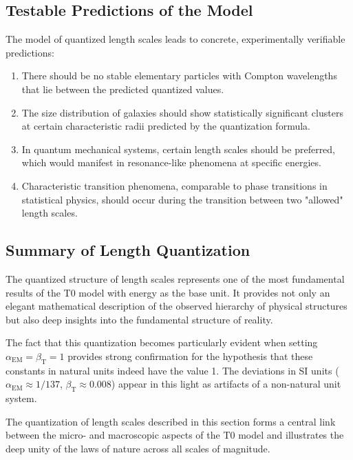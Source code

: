 \documentclass[12pt,a4paper]{article}
\newcommand{\alphaEM}{\alpha_{\text{EM}}}
\newcommand{\betaT}{\beta_{\text{T}}}
\begin{document}
\subsection{Testable Predictions of the Model}

The model of quantized length scales leads to concrete, experimentally verifiable predictions:

\begin{enumerate}
	\item There should be no stable elementary particles with Compton wavelengths that lie between the predicted quantized values.
	
	\item The size distribution of galaxies should show statistically significant clusters at certain characteristic radii predicted by the quantization formula.
	
	\item In quantum mechanical systems, certain length scales should be preferred, which would manifest in resonance-like phenomena at specific energies.
	
	\item Characteristic transition phenomena, comparable to phase transitions in statistical physics, should occur during the transition between two "allowed" length scales.
\end{enumerate}

\subsection{Summary of Length Quantization}

The quantized structure of length scales represents one of the most fundamental results of the T0 model with energy as the base unit. It provides not only an elegant mathematical description of the observed hierarchy of physical structures but also deep insights into the fundamental structure of reality.

The fact that this quantization becomes particularly evident when setting $\alphaEM = \betaT = 1$ provides strong confirmation for the hypothesis that these constants in natural units indeed have the value 1. The deviations in SI units ($\alphaEM \approx 1/137$, $\betaT \approx 0.008$) appear in this light as artifacts of a non-natural unit system.

The quantization of length scales described in this section forms a central link between the micro- and macroscopic aspects of the T0 model and illustrates the deep unity of the laws of nature across all scales of magnitude.
\end{document}

